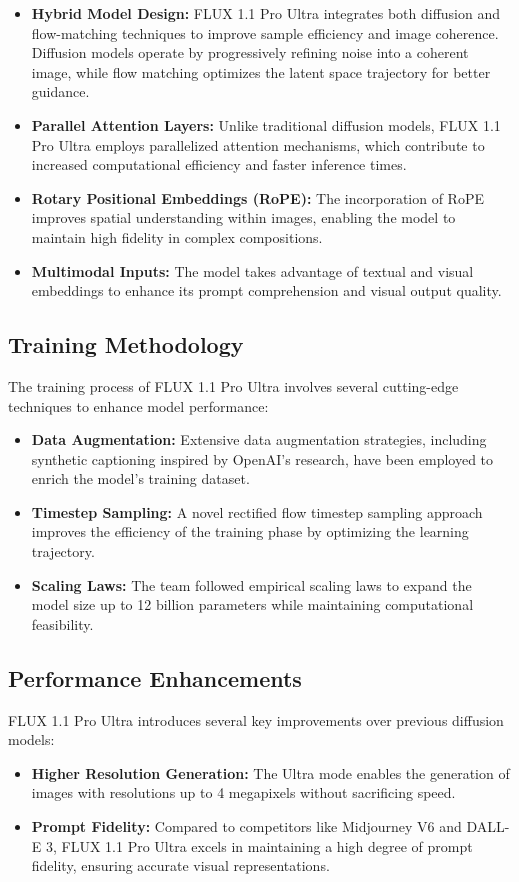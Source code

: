 \begin{itemize}
    \item \textbf{Hybrid Model Design:} FLUX 1.1 Pro Ultra integrates both diffusion and flow-matching techniques to improve sample efficiency and image coherence. Diffusion models operate by progressively refining noise into a coherent image, while flow matching optimizes the latent space trajectory for better guidance.
    \item \textbf{Parallel Attention Layers:} Unlike traditional diffusion models, FLUX 1.1 Pro Ultra employs parallelized attention mechanisms, which contribute to increased computational efficiency and faster inference times.
    \item \textbf{Rotary Positional Embeddings (RoPE):} The incorporation of RoPE improves spatial understanding within images, enabling the model to maintain high fidelity in complex compositions.
    \item \textbf{Multimodal Inputs:} The model takes advantage of textual and visual embeddings to enhance its prompt comprehension and visual output quality.
\end{itemize}

\subsection{Training Methodology}
The training process of FLUX 1.1 Pro Ultra involves several cutting-edge techniques to enhance model performance:

\begin{itemize}
    \item \textbf{Data Augmentation:} Extensive data augmentation strategies, including synthetic captioning inspired by OpenAI's research, have been employed to enrich the model's training dataset.
    \item \textbf{Timestep Sampling:} A novel rectified flow timestep sampling approach improves the efficiency of the training phase by optimizing the learning trajectory.
    \item \textbf{Scaling Laws:} The team followed empirical scaling laws to expand the model size up to 12 billion parameters while maintaining computational feasibility.
\end{itemize}

\subsection{Performance Enhancements}
FLUX 1.1 Pro Ultra introduces several key improvements over previous diffusion models:

\begin{itemize}
    \item \textbf{Higher Resolution Generation:} The Ultra mode enables the generation of images with resolutions up to 4 megapixels without sacrificing speed.
    \item \textbf{Prompt Fidelity:} Compared to competitors like Midjourney V6 and DALL-E 3, FLUX 1.1 Pro Ultra excels in maintaining a high degree of prompt fidelity, ensuring accurate visual representations.
\end{itemize}
